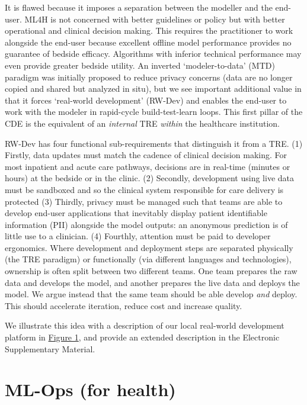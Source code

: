 It is flawed because it imposes a separation between the modeller and
the end-user. ML4H is not concerned with better guidelines or policy but
with better operational and clinical decision making. This requires the
practitioner to work alongside the end-user because excellent offline
model performance provides no guarantee of bedside efficacy. Algorithms
with inferior technical performance may even provide greater bedside
utility.\citep{the2021, shah2019} An inverted `modeler-to-data' (MTD)
paradigm was initially proposed to reduce privacy concerns (data are no
longer copied and shared but analyzed in situ\citep{guinney2018}), but
we see important additional value in that it forces `real-world
development' (RW-Dev) and enables the end-user to work with the modeler
in rapid-cycle build-test-learn loops. This first pillar of the CDE is
the equivalent of an \emph{internal} TRE \emph{within} the healthcare
institution.\citep{guinney2018}

RW-Dev has four functional sub-requirements that distinguish it from a
TRE. (1) Firstly, data updates must match the cadence of clinical
decision making. For most inpatient and acute care pathways, decisions
are in real-time (minutes or hours) at the bedside or in the clinic. (2)
Secondly, development using live data must be sandboxed and so the
clinical system responsible for care delivery is protected (3) Thirdly,
privacy must be managed such that teams are able to develop end-user
applications that inevitably display patient identifiable information
(PII) alongside the model outputs: an anonymous prediction is of little
use to a clinician. (4) Fourthly, attention must be paid to developer
ergonomics. Where development and deployment steps are separated
physically (the TRE paradigm) or functionally (via different languages
and technologies), ownership is often split between two different teams.
One team prepares the raw data and develops the model, and another
prepares the live data and deploys the model. We argue instead that the
same team should be able develop \emph{and} deploy. This should
accelerate iteration, reduce cost and increase quality.\citep{2022b}

We illustrate this idea with a description of our local real-world
development platform in \href{fig:1}{Figure 1}, and provide an extended
description in the Electronic Supplementary Material.

\hypertarget{ml-ops-for-health}{%
\section{ML-Ops (for health)}\label{ml-ops-for-health}}

